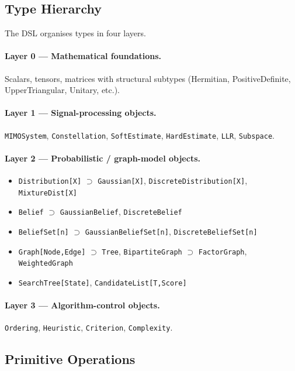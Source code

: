 \documentclass[12pt,a4paper]{article}
\begin{document}
\subsection{Type Hierarchy}

The DSL organises types in four layers.

\paragraph{Layer 0 --- Mathematical foundations.}
Scalars, tensors, matrices with structural subtypes
(Hermitian, PositiveDefinite, UpperTriangular, Unitary, etc.).

\paragraph{Layer 1 --- Signal-processing objects.}
\texttt{MIMOSystem}, \texttt{Constellation}, \texttt{SoftEstimate},
\texttt{HardEstimate}, \texttt{LLR}, \texttt{Subspace}.

\paragraph{Layer 2 --- Probabilistic / graph-model objects.}
\begin{itemize}[itemsep=0pt]
  \item \texttt{Distribution[X]} $\supset$ \texttt{Gaussian[X]},
        \texttt{DiscreteDistribution[X]}, \texttt{MixtureDist[X]}
  \item \texttt{Belief} $\supset$ \texttt{GaussianBelief},
        \texttt{DiscreteBelief}
  \item \texttt{BeliefSet[n]} $\supset$ \texttt{GaussianBeliefSet[n]},
        \texttt{DiscreteBeliefSet[n]}
  \item \texttt{Graph[Node,Edge]} $\supset$ \texttt{Tree},
        \texttt{BipartiteGraph} $\supset$ \texttt{FactorGraph},
        \texttt{WeightedGraph}
  \item \texttt{SearchTree[State]}, \texttt{CandidateList[T,Score]}
\end{itemize}

\paragraph{Layer 3 --- Algorithm-control objects.}
\texttt{Ordering}, \texttt{Heuristic}, \texttt{Criterion},
\texttt{Complexity}.

\subsection{Primitive Operations}
\end{document}
